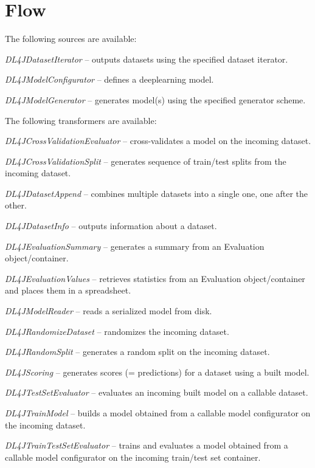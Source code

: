 \documentclass[a4paper]{book}
\begin{document}
\chapter{Flow}

The following sources are available:
\begin{tight_itemize}
  \item \textit{DL4JDatasetIterator} -- outputs datasets using the specified
  dataset iterator.
  \item \textit{DL4JModelConfigurator} -- defines a deeplearning model.
  \item \textit{DL4JModelGenerator} -- generates model(s) using the specified
  generator scheme.
\end{tight_itemize}

The following transformers are available:
\begin{tight_itemize}
  \item \textit{DL4JCrossValidationEvaluator} -- cross-validates a model
  on the incoming dataset.
  \item \textit{DL4JCrossValidationSplit} -- generates sequence of train/test
  splits from the incoming dataset.
  \item \textit{DL4JDatasetAppend} -- combines multiple datasets into a single one,
  one after the other.
  \item \textit{DL4JDatasetInfo} -- outputs information about a dataset.
  \item \textit{DL4JEvaluationSummary} -- generates a summary from an Evaluation
  object/container.
  \item \textit{DL4JEvaluationValues} -- retrieves statistics from an Evaluation
  object/container and places them in a spreadsheet.
  \item \textit{DL4JModelReader} -- reads a serialized model from disk.
  \item \textit{DL4JRandomizeDataset} -- randomizes the incoming dataset.
  \item \textit{DL4JRandomSplit} -- generates a random split on the incoming dataset.
  \item \textit{DL4JScoring} -- generates scores (= predictions) for a dataset
  using a built model.
  \item \textit{DL4JTestSetEvaluator} -- evaluates an incoming built model on a
  callable dataset.
  \item \textit{DL4JTrainModel} -- builds a model obtained from a callable model
  configurator on the incoming dataset.
  \item \textit{DL4JTrainTestSetEvaluator} -- trains and evaluates a model obtained
  from a callable model configurator on the incoming train/test set container.
\end{tight_itemize}
\end{document}
